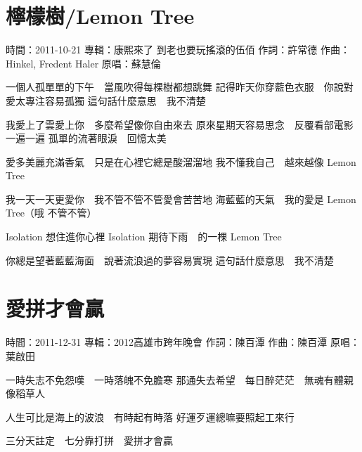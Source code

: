 \documentclass[UTF8,a4paper,oneside,twocolumn,12pt]{ctexbook}
\newcommand{\infopair}[2]{\textbullet #1：#2}
\newcommand{\zc}[1][伍佰]{\infopair{作詞}{#1}}
\newcommand{\zq}[1][伍佰]{\infopair{作曲}{#1}}
\newcommand{\zj}[1]{\infopair{專輯}{#1}}
\newcommand{\yc}[1]{\infopair{原唱}{#1}}
\newcommand{\sj}[1]{\infopair{時間}{#1}}
\newenvironment{info}{\begin{flushleft}\kaishu
	}
	{\end{flushleft}\normalsize\yahei\par}
\newenvironment{lyric}{
	}
{}
\begin{document}
\section{檸檬樹/Lemon Tree}
\begin{info}
	\sj{2011-10-21}
	\zj{康熙來了 到老也要玩搖滾的伍佰}
	\zc[許常德]
	\zq[Hinkel, Fredent Haler]
	\yc{蘇慧倫}
\end{info}
\begin{lyric}
	一個人孤單單的下午　當風吹得每棵樹都想跳舞
	記得昨天你穿藍色衣服　你說對愛太專注容易孤獨
	這句話什麼意思　我不清楚

	我愛上了雲愛上你　多麼希望像你自由來去
	原來星期天容易思念　反覆看部電影一遍一遍
	孤單的流著眼淚　回憶太美

	愛多美麗充滿香氣　只是在心裡它總是酸溜溜地
	我不懂我自己　越來越像 Lemon Tree

	我一天一天更愛你　我不管不管不管愛會苦苦地
	海藍藍的天氣　我的愛是 Lemon Tree（哦 不管不管）

	Isolation 想住進你心裡
	Isolation 期待下雨　的一棵 Lemon Tree

	你總是望著藍藍海面　說著流浪過的夢容易實現
	這句話什麼意思　我不清楚
\end{lyric}

\section{愛拼才會贏}
\begin{info}
	\sj{2011-12-31}
	\zj{2012高雄市跨年晚會}
	\zc[陳百潭]
	\zq[陳百潭]
	\yc{葉啟田}
\end{info}
\begin{lyric}
	一時失志不免怨嘆　一時落魄不免膽寒
	那通失去希望　每日醉茫茫　無魂有體親像稻草人

	人生可比是海上的波浪　有時起有時落
	好運歹運總嘛要照起工來行

	三分天註定　七分靠打拼　愛拼才會贏
\end{lyric}
\end{document}
